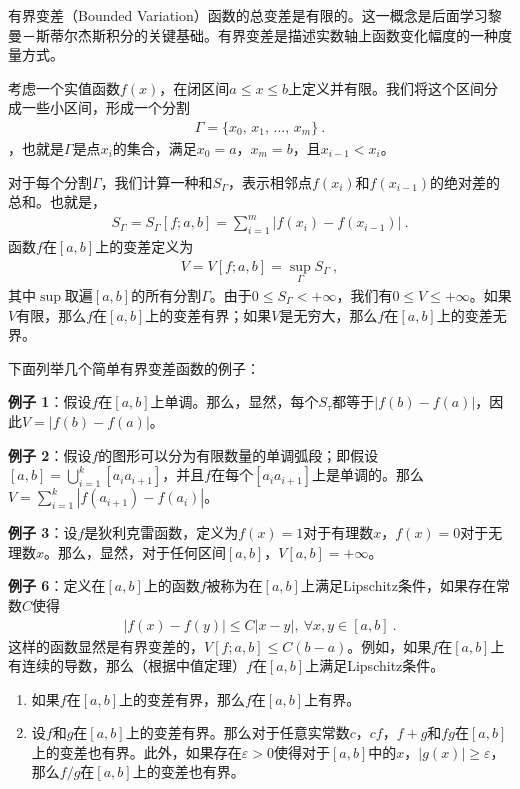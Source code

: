 
有界变差（Bounded Variation）函数的总变差是有限的。这一概念是后面学习黎曼－斯蒂尔杰斯积分的关键基础。有界变差是描述实数轴上函数变化幅度的一种度量方式。

考虑一个实值函数$f(x)$，在闭区间$a\leq x\leq b$上定义并有限。我们将这个区间分成一些小区间，形成一个分割
\begin{align} 
\Gamma=\{x_{0},\,x_{1},\,\ldots,\,x_{m}\} ~.
\end{align}，也就是$\Gamma$是点$x_{i}$的集合，满足$x_{0}=a$，$x_{m}=b$，且$x_{i-1}<x_{i}$。

对于每个分割$\Gamma$，我们计算一种和$S_{\Gamma}$，表示相邻点$f(x_{i})$和$f(x_{i-1})$的绝对差的总和。也就是，
\begin{align} 
S_{\Gamma}=S_{\Gamma}[f;a,b]=\sum_{i=1}^{m}|f(x_{i})-f(x_{i-1})|~.
\end{align}
函数$f$在$[a,b]$上的变差定义为
\begin{align} 
V=V[f;a,b]=\sup_{\Gamma}S_{\Gamma}~, 
\end{align}
其中$\sup$取遍$[a,b]$的所有分割$\Gamma$。由于$0\leq S_{\Gamma}<+\infty$，我们有$0\leq V\leq+\infty$。如果$V$有限，那么$f$在$[a,b]$上的变差有界；如果$V$是无穷大，那么$f$在$[a,b]$上的变差无界。

下面列举几个简单有界变差函数的例子：

\textbf{例子 1}：假设$f$在$[a,b]$上单调。那么，显然，每个$S_{\tau}$都等于$|f(b)-f(a)|$，因此$V=|f(b)-f(a)|$。

\textbf{例子 2}：假设$f$的图形可以分为有限数量的单调弧段；即假设$[a,b]=\bigcup_{i=1}^{k}[a_{i}a_{i+1}]$，并且$f$在每个$[a_{i}a_{i+1}]$上是单调的。那么$V=\sum_{i=1}^{k}|f(a_{i+1})-f(a_{i})|$。

\textbf{例子 3}：设$f$是狄利克雷函数，定义为$f(x)=1$对于有理数$x$，$f(x)=0$对于无理数$x$。那么，显然，对于任何区间$[a,b]$，$V[a,b]=+\infty$。

\textbf{例子 6}：定义在$[a,b]$上的函数$f$被称为在$[a,b]$上满足Lipschitz条件，如果存在常数$C$使得
\begin{align} 
|f(x)-f(y)|\leq C|x-y|, \
\forall x,y\in[a,b]~.
\end{align}
这样的函数显然是有界变差的，$V[f;a,b]\leq C(b-a)$。例如，如果$f$在$[a,b]$上有连续的导数，那么（根据中值定理）$f$在$[a,b]$上满足Lipschitz条件。

\begin{theorem}{}
\begin{enumerate}
\item 如果$f$在$[a,b]$上的变差有界，那么$f$在$[a,b]$上有界。
\item 设$f$和$g$在$[a,b]$上的变差有界。那么对于任意实常数$c$，$cf$，$f+g$和$fg$在$[a,b]$上的变差也有界。此外，如果存在$\varepsilon>0$使得对于$[a,b]$中的$x$，$|g(x)|\geq\varepsilon$，那么$f/g$在$[a,b]$上的变差也有界。
\end{enumerate}
\end{theorem}

